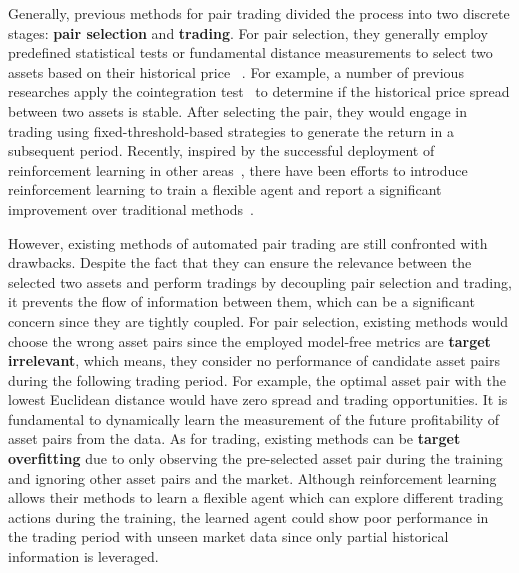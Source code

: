 \documentclass[sigconf]{acmart}
\begin{document}
Generally, previous methods for pair trading divided the process into two discrete stages: \textbf{pair selection} and \textbf{trading}. For pair selection, they generally employ predefined statistical tests or fundamental distance measurements to select two assets based on their historical price ~\cite{gatev2006pairs,vidyamurthy2004pairs,Huck2015PairsTA,Do2012ArePT,Chen2019EmpiricalIO,Pole2007StatisticalAA,Perlin2007MOA,Rad2015ThePO,Lin2006LossPI,Puspaningrum2010FindingTO,elliott2005pairs,Galenko2012TradingIT,Bertram2009AnalyticSF,Chen2014PairsTV}.
For example, a number of previous researches apply the cointegration test~\cite{vidyamurthy2004pairs} to determine if the historical price spread between two assets is stable.
After selecting the pair, they would engage in trading using fixed-threshold-based strategies to generate the return in a subsequent period.
Recently, inspired by the successful deployment of reinforcement learning in other areas~\cite{fischer2018reinforcement,almahdi2019constrained,katongo2021use,lucarelli2019deep}, there have been efforts to introduce reinforcement learning to train a flexible agent and report a significant improvement over traditional methods~\cite{fallahpour2016pairs, Kim2022HybridDR, wang2021improving}.
	
However, existing methods of automated pair trading are still confronted with drawbacks.
Despite the fact that they can ensure the relevance between the selected two assets and perform tradings by decoupling pair selection and trading,
it prevents the flow of information between them, which can be a significant concern since they are tightly coupled.
For pair selection, existing methods would choose the wrong asset pairs since the employed model-free metrics are \textbf{target irrelevant}, which means, they consider no performance of candidate asset pairs during the following trading period.
For example, the optimal asset pair with the lowest Euclidean distance would have zero spread and trading opportunities.
It is fundamental to dynamically learn the measurement of the future profitability of asset pairs from the data.
As for trading, existing methods can be \textbf{target overfitting} due to only observing the pre-selected asset pair during the training and ignoring other asset pairs and the market.
Although reinforcement learning allows their methods to learn a flexible agent which can explore different trading actions during the training, the learned agent could show poor performance in the trading period with unseen market data since only partial historical information is leveraged.
\end{document}
